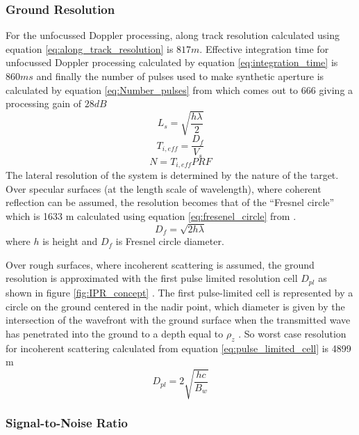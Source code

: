 \subsubsection{Ground Resolution}

For the unfocussed Doppler processing, along track resolution calculated using equation \ref{eq:along_track_resolution} is $817 m$. Effective integration time for unfocussed Doppler processing calculated by equation \ref{eq:integration_time} is $860 ms$ and finally the number of pulses used to make synthetic aperture is calculated by equation \ref{eq:Number_pulses} from \cite{Gany_SRS}  which comes out to 666 giving a processing gain of $28 dB$ 
%
\begin{equation}
L_{s} = \sqrt{\dfrac{h\lambda}{2}}
\label{eq:along_track_resolution}
\end{equation}
%
\begin{equation}
T_{i,eff} = \dfrac{D_{f}}{V_{s}}
\label{eq:integration_time}
\end{equation}
\begin{equation}
N = T_{i,eff}PRF 
\label{eq:Number_pulses}
\end{equation}
The lateral resolution of the system is determined by the nature of the target.
Over specular surfaces (at the length scale of wavelength), where coherent reflection can be assumed, the resolution becomes that of the ``Fresnel circle'' which is 1633 m calculated using equation \ref{eq:fresenel_circle} from \cite{SHARAD}.
\begin{equation}
D_{f} = \sqrt{2h\lambda}
\label{eq:fresenel_circle}
\end{equation}
where $h$ is height and $D_{f}$ is Fresnel circle diameter.

Over rough surfaces, where incoherent scattering is assumed, the ground resolution is approximated with the first pulse limited resolution cell $D_{pl}$ as shown in figure \ref{fig:IPR_concept} . The first pulse-limited cell is represented by a circle on the ground centered in the nadir point, which diameter is given by the intersection of the wavefront with the ground surface when the transmitted wave has penetrated into the ground to a depth equal to $\rho_{z}$ \cite{Gany_SRS}. So worst case resolution for incoherent scattering calculated from equation \ref{eq:pulse_limited_cell} is 4899 m 
\begin{equation}
D_{pl} = 2\sqrt{\dfrac{hc}{B_{w}}}
\label{eq:pulse_limited_cell}
\end{equation}
%
\subsubsection{Signal-to-Noise Ratio}

